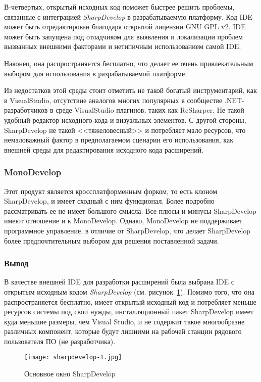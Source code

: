В-четвертых, открытый исходных код поможет быстрее решить проблемы, связанные с интеграцией {\it SharpDevelop} в разрабатываемую платформу. Код IDE может быть отредактирован благодаря открытой лицензии GNU GPL v2. IDE может быть запущена под отладчиком для выявления и локализации проблем вызванных внешними факторами и нетипичным использованием самой IDE.

Наконец, она распространяется бесплатно, что делает ее очень привлекательным выбором для использования в разрабатываемой платформе.

Из недостатков этой среды стоит отметить не такой богатый инструментарий, как в VisualStudio, отсутствие аналогов многих популярных в сообществе .NET-разработчиков в среде  VisualStudio плагинов, таких как ReSharper. Не такой удобный редактор исходного кода и визуальных элементов. С другой стороны, SharpDevelop не такой <<тяжеловесный>> и потребляет мало ресурсов, что немаловажный фактор в предполагаемом сценарии его использования, как внешней среды для редактирования исходного кода расширений.

\subsubsection{MonoDevelop}

Этот продукт является кроссплатформенным форком, то есть клоном SharpDevelop, и имеет сходный с ним функционал. Более подробно рассматривать ее не имеет большого смысла. Все плюсы и минусы SharpDevelop имеют отношение и к MonoDevelop. Однако, MonoDevelop не поддерживает программное управление, в отличие от SharpDevelop, что делает SharpDevelop более предпочтительным выбором для решения поставленной задачи.

\subsubsection{Вывод}

В качестве внешней IDE для разработки расширений была выбрана IDE с открытым исходным кодом {\it SharpDevelop} (см. рисунок~\ref{pic:sharpdevelop-main-wnd}). Помимо того, что она распространяется бесплатно, имеет открытый исходный код и потребляет меньше ресурсов системы под свои нужды, инсталляционный пакет SharpDevelop имеет куда меньшие размеры, чем Visual Studio, и не содержит такое многообразие различных компонент, которые будут лишними на рабочей станции рядового пользователя ПО (не разработчика).

\begin{figure}[!h]
    \centering
    \texttt{[image: sharpdevelop-1.jpg]}
    \caption{Основное окно SharpDevelop}
    \label{pic:sharpdevelop-main-wnd}
\end{figure} 

\pagebreak

